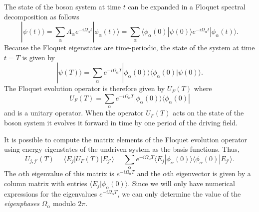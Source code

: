 \documentclass{article}
\begin{document}
The  state of the boson system at time $t$ can be expanded in a Floquet spectral decomposition as follows
%
\begin{equation}
|\psi(t)\rangle = \sum_{\alpha}A_{\alpha}e^{-i\Omega_{\alpha}t}|\phi_{\alpha}(t)\rangle
= \sum_{\alpha}\langle \phi_{\alpha}(0)|\psi(0)\rangle e^{-i\Omega_{\alpha}t}|\phi_{\alpha}(t)\rangle .
\end{equation}
%
Because the Floquet eigenstates are time-periodic, the state of the system at time $t=T$ is given by
%
\begin{equation}
|\psi(T)\rangle = \sum_{\alpha} e^{-i\Omega_{\alpha}T}|\phi_{\alpha}(0)\rangle\langle \phi_{\alpha}(0)|\psi(0)\rangle .
\end{equation}
%
The Floquet evolution operator is therefore given  by $U_F(T)$ where
\begin{equation}
U_F(T) = \sum_{\alpha} e^{-i\Omega_{\alpha}T}|\phi_{\alpha}(0)\rangle\langle \phi_{\alpha}(0)|
\end{equation}
%
and is a unitary operator.  When the operator $U_F(T)$ acts on the state of the boson system it evolves it forward in time by one period of the driving field.

It is possible to compute the matrix elements of the Floquet evolution operator using energy eigenstates of the undriven system as the basis functions. Thus, 
%
\begin{equation}
U_{j,j'}(T) = \langle E_j|U_F(T)|E_{j'}\rangle 
= \sum_{\alpha} e^{-i\Omega_{\alpha}T}\langle E_j|\phi_{\alpha}(0)\rangle\langle \phi_{\alpha}(0)|E_{j'}\rangle.
\label{eq:Floquet_mat}
\end{equation}
%
The $\alpha$th eigenvalue of this matrix is $e^{-i\Omega_{\alpha}T}$ and the $\alpha$th eigenvector is given by a column matrix  with entries ${\langle}E_j|\phi_{\alpha}(0)\rangle$. Since we will only have numerical expressions for the eigenvalues $e^{-i\Omega_{\alpha}T}$, we can only determine the value of the \textit{eigenphases} $\Omega_{\alpha}$   modulo $2\pi$.
\end{document}
